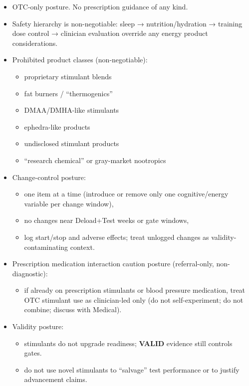 \documentclass[10pt]{article}
\begin{document}
\begin{itemize}
\item OTC-only posture. No prescription guidance of any kind.
\item Safety hierarchy is non-negotiable: sleep → nutrition/hydration → training dose control → clinician evaluation override any energy product considerations.
\item Prohibited product classes (non-negotiable):
  \begin{itemize}
  \item proprietary stimulant blends
  \item fat burners / “thermogenics”
  \item DMAA/DMHA-like stimulants
  \item ephedra-like products
  \item undisclosed stimulant products
  \item “research chemical” or gray-market nootropics
  \end{itemize}
\item Change-control posture:
  \begin{itemize}
  \item one item at a time (introduce or remove only one cognitive/energy variable per change window),
  \item no changes near Deload+Test weeks or gate windows,
  \item log start/stop and adverse effects; treat unlogged changes as validity-contaminating context.
  \end{itemize}
\item Prescription medication interaction caution posture (referral-only, non-diagnostic):
  \begin{itemize}
  \item if already on prescription stimulants or blood pressure medication, treat OTC stimulant use as clinician-led only (do not self-experiment; do not combine; discuss with Medical).
  \end{itemize}
\item Validity posture:
  \begin{itemize}
  \item stimulants do not upgrade readiness; \textbf{VALID} evidence still controls gates.
  \item do not use novel stimulants to “salvage” test performance or to justify advancement claims.
  \end{itemize}
\end{itemize}
\end{document}
